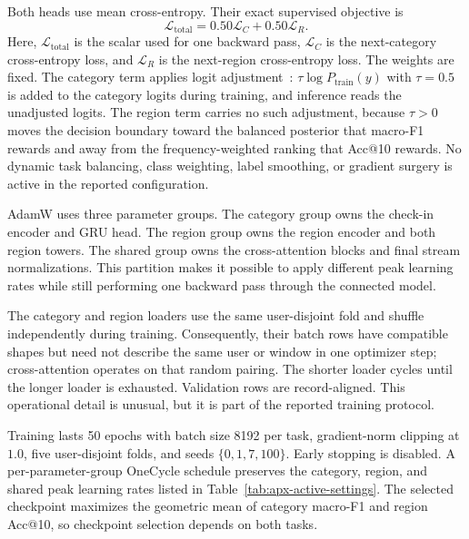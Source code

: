 Both heads use mean cross-entropy. Their exact supervised objective is
\begin{equation}
    \mathcal{L}_{\mathrm{total}}
    =0.50\mathcal{L}_{C}+0.50\mathcal{L}_{R}.
    \label{eq:apx-joint-loss}
\end{equation}
Here, $\mathcal{L}_{\mathrm{total}}$ is the scalar used for one backward pass,
$\mathcal{L}_{C}$ is the next-category cross-entropy loss, and
$\mathcal{L}_{R}$ is the next-region cross-entropy loss. The weights are fixed.
The category term applies logit adjustment~\cite{menon2021logitadjustment}:
$\tau\log P_{\mathrm{train}}(y)$ with $\tau=0.5$ is added to the category logits during
training, and inference reads the unadjusted logits. The region term carries no such adjustment, because $\tau>0$ moves the
decision boundary toward the balanced posterior that macro-F1 rewards and away from the
frequency-weighted ranking that Acc@10 rewards. No dynamic task balancing, class
weighting, label smoothing, or gradient surgery is active in the reported configuration.

AdamW uses three parameter groups. The category group owns the check-in encoder and
GRU head. The region group owns the region encoder and both region towers. The
shared group owns the cross-attention blocks and final stream normalizations. This
partition makes it possible to apply different peak learning rates while still
performing one backward pass through the connected model.

The category and region loaders use the same user-disjoint fold and shuffle
independently during training. Consequently, their batch rows have compatible
shapes but need not describe the same user or window in one optimizer step;
cross-attention operates on that random pairing. The shorter loader cycles until
the longer loader is exhausted. Validation rows are record-aligned. This
operational detail is unusual, but it is part of the reported training protocol.

Training lasts 50 epochs with batch size 8192 per task, gradient-norm clipping at
$1.0$, five user-disjoint folds, and seeds $\{0,1,7,100\}$. Early stopping is
disabled. A per-parameter-group OneCycle schedule preserves the category, region,
and shared peak learning rates listed in Table~\ref{tab:apx-active-settings}. The
selected checkpoint maximizes the geometric mean of category macro-F1 and region
Acc@10, so checkpoint selection depends on both tasks.

